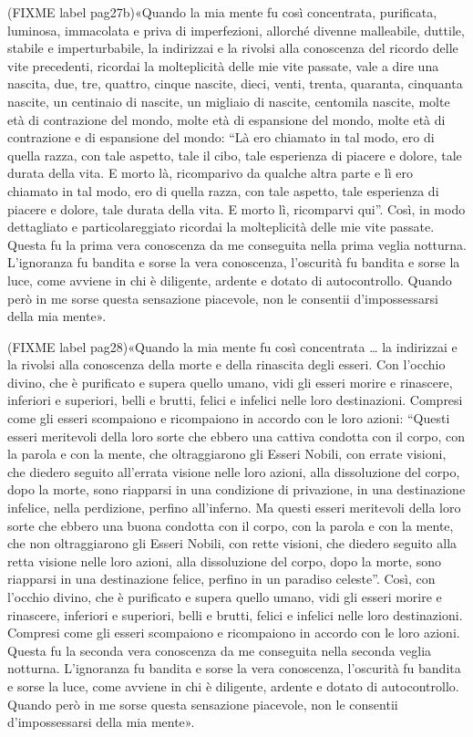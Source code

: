 (FIXME label pag27b)«Quando la mia mente fu così concentrata, purificata, luminosa,
immacolata e priva di imperfezioni, allorché divenne malleabile,
duttile, stabile e imperturbabile, la indirizzai e la rivolsi alla
conoscenza del ricordo delle vite precedenti, ricordai la molteplicità
delle mie vite passate, vale a dire una nascita, due, tre, quattro,
cinque nascite, dieci, venti, trenta, quaranta, cinquanta nascite, un
centinaio di nascite, un migliaio di nascite, centomila nascite, molte
età di contrazione del mondo, molte età di espansione del mondo, molte
età di contrazione e di espansione del mondo: “Là ero chiamato in tal
modo, ero di quella razza, con tale aspetto, tale il cibo, tale
esperienza di piacere e dolore, tale durata della vita. E morto là,
ricomparivo da qualche altra parte e lì ero chiamato in tal modo, ero di
quella razza, con tale aspetto, tale esperienza di piacere e dolore,
tale durata della vita. E morto lì, ricomparvi qui”. Così, in modo
dettagliato e particolareggiato ricordai la molteplicità delle mie vite
passate. Questa fu la prima vera conoscenza da me conseguita nella prima
veglia notturna. L’ignoranza fu bandita e sorse la vera conoscenza,
l’oscurità fu bandita e sorse la luce, come avviene in chi è diligente,
ardente e dotato di autocontrollo. Quando però in me sorse questa
sensazione piacevole, non le consentii d’impossessarsi della mia mente».


(FIXME label pag28)«Quando la mia mente fu così concentrata …​ la indirizzai e la rivolsi
alla conoscenza della morte e della rinascita degli esseri. Con l’occhio
divino, che è purificato e supera quello umano, vidi gli esseri morire e
rinascere, inferiori e superiori, belli e brutti, felici e infelici
nelle loro destinazioni. Compresi come gli esseri scompaiono e
ricompaiono in accordo con le loro azioni: “Questi esseri meritevoli
della loro sorte che ebbero una cattiva condotta con il corpo, con la
parola e con la mente, che oltraggiarono gli Esseri Nobili, con errate
visioni, che diedero seguito all’errata visione nelle loro azioni, alla
dissoluzione del corpo, dopo la morte, sono riapparsi in una condizione
di privazione, in una destinazione infelice, nella perdizione, perfino
all’inferno. Ma questi esseri meritevoli della loro sorte che ebbero una
buona condotta con il corpo, con la parola e con la mente, che non
oltraggiarono gli Esseri Nobili, con rette visioni, che diedero seguito
alla retta visione nelle loro azioni, alla dissoluzione del corpo, dopo
la morte, sono riapparsi in una destinazione felice, perfino in un
paradiso celeste”. Così, con l’occhio divino, che è purificato e supera
quello umano, vidi gli esseri morire e rinascere, inferiori e superiori,
belli e brutti, felici e infelici nelle loro destinazioni. Compresi come
gli esseri scompaiono e ricompaiono in accordo con le loro azioni.
Questa fu la seconda vera conoscenza da me conseguita nella seconda
veglia notturna. L’ignoranza fu bandita e sorse la vera conoscenza,
l’oscurità fu bandita e sorse la luce, come avviene in chi è diligente,
ardente e dotato di autocontrollo. Quando però in me sorse questa
sensazione piacevole, non le consentii d’impossessarsi della mia mente».



